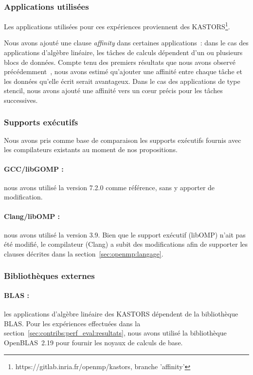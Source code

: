 \subsubsection{Applications utilisées}

Les applications utilisées pour ces expériences proviennent des KASTORS\footnote{https://gitlab.inria.fr/openmp/kastors, branche 'affinity'}.

Nous avons ajouté une clause \emph{affinity} dans certaines applications~: dans le cas des applications d'algèbre linéaire, les tâches de calculs dépendent d'un ou plusieurs blocs de données.
Compte tenu des premiers résultats que nous avons observé précédemment~\cite{Virouleau2016a}, nous avons estimé qu'ajouter une affinité entre chaque tâche et les données qu'elle écrit serait avantageux.
Dans le cas des applications de type stencil, nous avons ajouté une affinité vers un cœur précis pour les tâches successives.


\subsubsection{Supports exécutifs}


Nous avons pris comme base de comparaison les supports exécutifs fournis avec les compilateurs existants au moment de nos propositions.

\paragraph{GCC/libGOMP :} nous avons utilisé la version 7.2.0 comme référence, sans y apporter de modification.

\paragraph{Clang/libOMP :} nous avons utilisé la version 3.9. Bien que le support exécutif (libOMP) n'ait pas été modifié, le compilateur (Clang) a subit des modifications afin de supporter les clauses décrites dans la section~\ref{sec:openmp:langage}.

\subsubsection{Bibliothèques externes}

\paragraph{BLAS :} les applications d'algèbre linéaire des KASTORS dépendent de la bibliothèque BLAS.
Pour les expériences effectuées dans la section~\ref{sec:contribs:perf_eval:resultats}, nous avons utilisé la bibliothèque OpenBLAS~2.19 pour fournir les noyaux de calculs de base.


